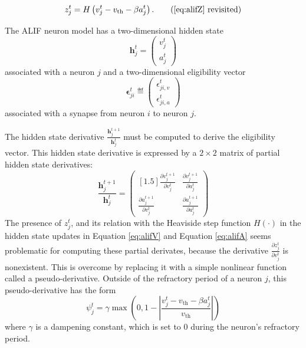             \begin{equation*}
            z^t_j = H\left(v_j^t - v_\text{th} - \beta a^t_j\right). \tag{\ref{eq:alifZ} revisited}
            \end{equation*}

            The ALIF neuron model has a two-dimensional hidden state
            \begin{equation}
            \mathbf{h}^t_j = \begin{pmatrix}
            v^t_j\\
            a^t_j
            \end{pmatrix}
            \end{equation}
            associated with a neuron $j$ and a two-dimensional eligibility vector
            \begin{equation}
            \mathbf{\epsilon}^t_{ji} \eqdef \begin{pmatrix}
            \epsilon_{ji, v}^t\\
            \epsilon_{ji, a}^t
            \end{pmatrix}
            \end{equation}
            associated with a synapse from neuron $i$ to neuron $j$.

            The hidden state derivative $\frac{\mathbf{h}^{t+1}_j}{\mathbf{h}^t_j}$ must be computed to derive the eligibility vector.
            This hidden state derivative is expressed by a $2\times2$ matrix of partial hidden state derivatives:
            \begin{equation}
            \frac{\mathbf{h}^{t+1}_j}{\mathbf{h}^t_j} = \begin{pmatrix}[1.5]
            \frac{\partial v^{t+1}_j}{\partial v^t_j} & \frac{\partial v^{t+1}_j}{\partial a^t_j}\\
            \frac{\partial a^{t+1}_j}{\partial v^t_j} & \frac{\partial a^{t+1}_j}{\partial a^t_j}
            \end{pmatrix}
            \end{equation}
            The presence of $z^t_j$, and its relation with the Heaviside step function $H(\cdot)$ in the hidden state updates in Equation \ref{eq:alifV} and Equation \ref{eq:alifA} seems problematic for computing these partial derivates, because the derivative $\frac{\partial z^t_j}{\partial v^t_j}$ is nonexistent.
            This is overcome by replacing it with a simple nonlinear function called a pseudo-derivative.
            Outside of the refractory period of a neuron $j$, this pseudo-derivative has the form
            \begin{equation}
            \psi_j^t = \gamma \max\left(0, 1 - \left|\frac{v_j^t - v_\text{th} - \beta a^t_j}{v_\text{th}}\right|\right)
            \end{equation}
            where $\gamma$ is a dampening constant, which is set to 0 during the neuron's refractory period.

